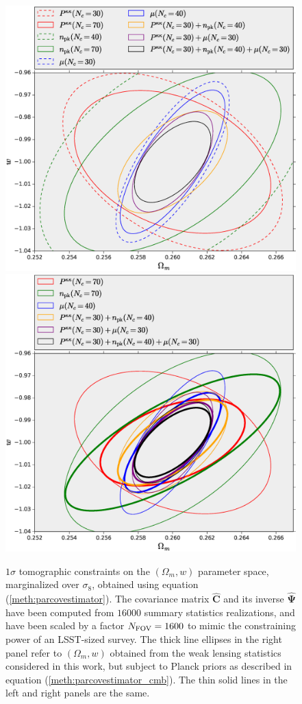 \documentclass[reprint,aps,prd,superscriptaddress,showkeys,showpacs]{revtex4-1}
\newcommand{\bbh}[1]{\mathbf{\hat{#1}}}
\begin{document}
\begin{figure}
\includegraphics[scale=0.3]{Figures/constraints_Om-w_lensing.eps}
\includegraphics[scale=0.3]{Figures/constraints_Om-w_lensing_cmb.eps}
\caption{$1\sigma$ tomographic constraints on the $(\Omega_m,w)$ parameter space, marginalized over $\sigma_8$, obtained using equation (\ref{meth:parcovestimator}). The covariance matrix $\bbh{C}$ and its inverse $\bbh{\Psi}$ have been computed from $16000$ summary statistics realizations, and have been scaled by a factor $N_{\rm FOV}=1600$ to mimic the constraining power of an LSST-sized survey. The thick line ellipses in the right panel refer to $(\Omega_m,w)$ obtained from the weak lensing statistics considered in this work, but subject to Planck priors as described in equation (\ref{meth:parcovestimator_cmb}). The thin solid lines in the left and right panels are the same.}
\label{fig:constraintsOm-w}
\end{figure}
\end{document}
